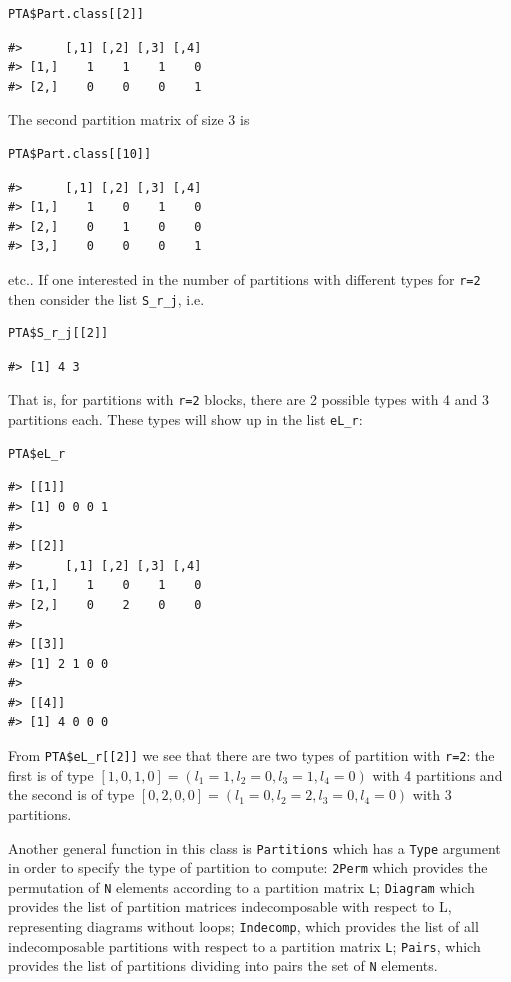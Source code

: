 \begin{verbatim}
PTA$Part.class[[2]]
\end{verbatim}

\begin{verbatim}
#>      [,1] [,2] [,3] [,4]
#> [1,]    1    1    1    0
#> [2,]    0    0    0    1
\end{verbatim}

The second partition matrix of size 3 is

\begin{verbatim}
PTA$Part.class[[10]] 
\end{verbatim}

\begin{verbatim}
#>      [,1] [,2] [,3] [,4]
#> [1,]    1    0    1    0
#> [2,]    0    1    0    0
#> [3,]    0    0    0    1
\end{verbatim}

etc.. If one interested in the number of partitions with different types for \texttt{r=2} then consider the list \texttt{S\_r\_j}, i.e.

\begin{verbatim}
PTA$S_r_j[[2]] 
\end{verbatim}

\begin{verbatim}
#> [1] 4 3
\end{verbatim}

That is, for partitions with \texttt{r=2} blocks, there are 2 possible types with 4 and 3 partitions each. These types will show up in the list \texttt{eL\_r}:

\begin{verbatim}
PTA$eL_r
\end{verbatim}

\begin{verbatim}
#> [[1]]
#> [1] 0 0 0 1
#> 
#> [[2]]
#>      [,1] [,2] [,3] [,4]
#> [1,]    1    0    1    0
#> [2,]    0    2    0    0
#> 
#> [[3]]
#> [1] 2 1 0 0
#> 
#> [[4]]
#> [1] 4 0 0 0
\end{verbatim}

From \texttt{PTA\$eL\_r{[}{[}2{]}{]}}
we see that there are two types of partition with \texttt{r=2}: the first is
of type \(\left[ 1,0,1,0\right] ={(l_{1}=1,l_{2}=0,l_{3}=1,l_{4}=0)}\) with 4 partitions and the second is of type \(\left[ 0,2,0,0\right] ={(l_{1}=0,l_{2}=2,l_{3}=0,l_{4}=0)}\) with 3 partitions.

Another general function in this class is \texttt{Partitions} which has a \texttt{Type} argument in order to specify the type of partition to compute: \texttt{2Perm} which provides the permutation of \texttt{N} elements according to a partition matrix \texttt{L}; \texttt{Diagram} which provides the list of partition matrices indecomposable with respect to L, representing diagrams without loops;
\texttt{Indecomp}, which provides the list of all indecomposable partitions with respect to a partition matrix \texttt{L}; \texttt{Pairs}, which provides the list of partitions dividing into pairs the set of \texttt{N} elements.

